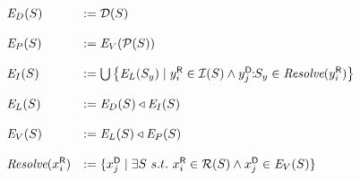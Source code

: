 \begin{figure}[t]
\renewcommand{\S}{\mathcal{S}}
\renewcommand{\Env}[4]{\mbox{\it{E}}_{#1}(#4)}
\renewcommand{\Res}[2]{\mbox{\it{Resolve}}(#2)}
$$
\begin{array}{ll}
 \Env{D}{\seeni}{\seens}{S} &:= 
      \D{S} \\
 \\
 \Env{P}{\seeni}{\seens}{S} & := 
      \Env{V}{\seeni}{\{S\}\cup\seens}{\P{S}} \\
 \\
 \Env{I}{\seeni}{\seens}{S} & := 
      \bigcup \left\{ \Env{L}{\seeni}{\{S\}\cup\seens}{S_y} \mid \ri{y}{i} \in \I{S} \wedge \dsi{y}{j}{S_y} \in \Res{\seeni}{\ri{y}{i}}\right\}\\
 \\
 \Env{L}{\seeni}{\seens}{S} & := \Env{D}{\seeni}{\seens}{S} \triangleleft \Env{I}{\seeni}{\seens}{S} \\
 \\
  \Env{V}{\seeni}{\seens}{S}  & := \Env{L}{\seeni}{\seens}{S} \triangleleft \Env{P}{\seeni}{\seens}{S} \\
  \\
  \Res{\seeni}{\ri{x}{i}} & := \{ \di{x}{j} \mid \exists S\ s.t.\ \ri{x}{i} \in \R{S} \wedge \di{x}{j} \in \Env{V}{\{\ri{x}{i}\} \cup \seeni}{\emptyset}{S} \} \\
\end{array}\medskip
$$
\end{figure}
